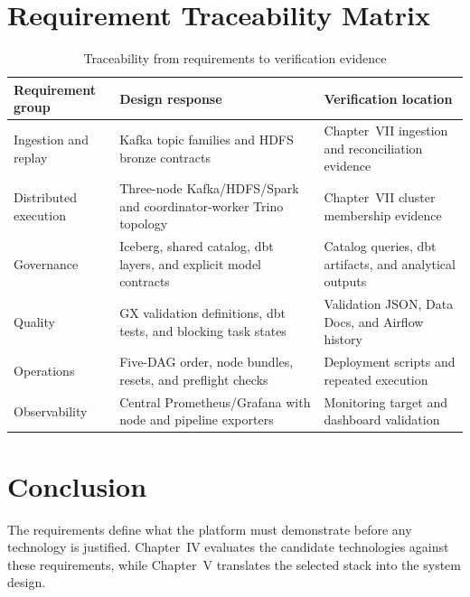 \section{Requirement Traceability Matrix}
\begin{table}[htbp]
    \centering
    \small
    \begin{tabularx}{\textwidth}{|>{\raggedright\arraybackslash}p{}|>{\raggedright\arraybackslash}p{}|X|}
        \hline
        \rowcolor{ModernTableHeader}
        \color{white}\textbf{Requirement group} & \color{white}\textbf{Design response} & \color{white}\textbf{Verification location} \\
        \hline
        Ingestion and replay & Kafka topic families and HDFS bronze contracts & Chapter~VII ingestion and reconciliation evidence \\
        \hline
        Distributed execution & Three-node Kafka/HDFS/Spark and coordinator-worker Trino topology & Chapter~VII cluster membership evidence \\
        \hline
        Governance & Iceberg, shared catalog, dbt layers, and explicit model contracts & Catalog queries, dbt artifacts, and analytical outputs \\
        \hline
        Quality & GX validation definitions, dbt tests, and blocking task states & Validation JSON, Data Docs, and Airflow history \\
        \hline
        Operations & Five-DAG order, node bundles, resets, and preflight checks & Deployment scripts and repeated execution \\
        \hline
        Observability & Central Prometheus/Grafana with node and pipeline exporters & Monitoring target and dashboard validation \\
        \hline
    \end{tabularx}
    \caption{Traceability from requirements to verification evidence}
    \label{tab:refactor-requirement-traceability}
\end{table}

\section{Conclusion}
The requirements define what the platform must demonstrate before any technology is justified. Chapter~IV evaluates the candidate technologies against these requirements, while Chapter~V translates the selected stack into the system design.